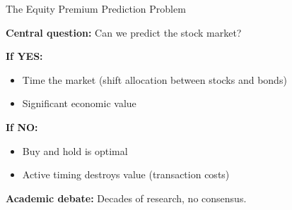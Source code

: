 \documentclass[10pt]{beamer}
\begin{document}
\begin{frame}{The Equity Premium Prediction Problem}

\textbf{Central question:} Can we predict the stock market?

\vspace{1em}
\textbf{If YES:}
\begin{itemize}
  \item Time the market (shift allocation between stocks and bonds)
  \item Significant economic value
\end{itemize}

\vspace{0.5em}
\textbf{If NO:}
\begin{itemize}
  \item Buy and hold is optimal
  \item Active timing destroys value (transaction costs)
\end{itemize}

\vspace{1em}
\textbf{Academic debate:} Decades of research, no consensus.

\end{frame}

\end{document}
